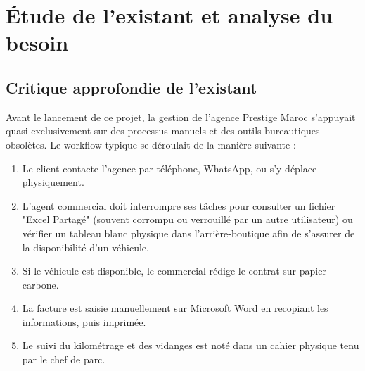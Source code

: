 \chapter{Étude de l'existant et analyse du besoin}

\section{Critique approfondie de l'existant}
Avant le lancement de ce projet, la gestion de l'agence Prestige Maroc s'appuyait quasi-exclusivement sur des processus manuels et des outils bureautiques obsolètes. Le workflow typique se déroulait de la manière suivante :
\begin{enumerate}
    \item Le client contacte l'agence par téléphone, WhatsApp, ou s'y déplace physiquement.
    \item L'agent commercial doit interrompre ses tâches pour consulter un fichier "Excel Partagé" (souvent corrompu ou verrouillé par un autre utilisateur) ou vérifier un tableau blanc physique dans l'arrière-boutique afin de s'assurer de la disponibilité d'un véhicule.
    \item Si le véhicule est disponible, le commercial rédige le contrat sur papier carbone.
    \item La facture est saisie manuellement sur Microsoft Word en recopiant les informations, puis imprimée.
    \item Le suivi du kilométrage et des vidanges est noté dans un cahier physique tenu par le chef de parc.
\end{enumerate}

